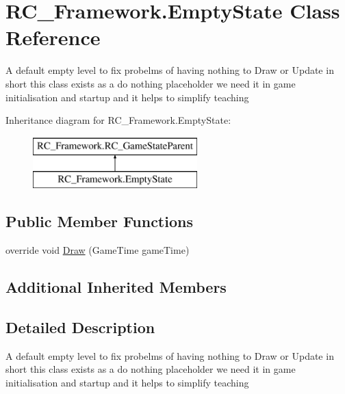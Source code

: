 \hypertarget{class_r_c___framework_1_1_empty_state}{}\section{R\+C\+\_\+\+Framework.\+Empty\+State Class Reference}
\label{class_r_c___framework_1_1_empty_state}


A default \textquotesingle{}empty\textquotesingle{} level to fix probelms of having nothing to Draw or Update in short this class exists as a do nothing placeholder we need it in game initialisation and startup and it helps to simplify teaching  


Inheritance diagram for R\+C\+\_\+\+Framework.\+Empty\+State\+:\begin{figure}[H]
\begin{center}
\leavevmode
\includegraphics[height=2.000000cm]{class_r_c___framework_1_1_empty_state}
\end{center}
\end{figure}
\subsection*{Public Member Functions}
\begin{DoxyCompactItemize}
\item 
override void \mbox{\hyperlink{class_r_c___framework_1_1_empty_state_adfa60e364416dfe5f9a3ba565bc6329b}{Draw}} (Game\+Time game\+Time)
\end{DoxyCompactItemize}
\subsection*{Additional Inherited Members}


\subsection{Detailed Description}
A default \textquotesingle{}empty\textquotesingle{} level to fix probelms of having nothing to Draw or Update in short this class exists as a do nothing placeholder we need it in game initialisation and startup and it helps to simplify teaching 



